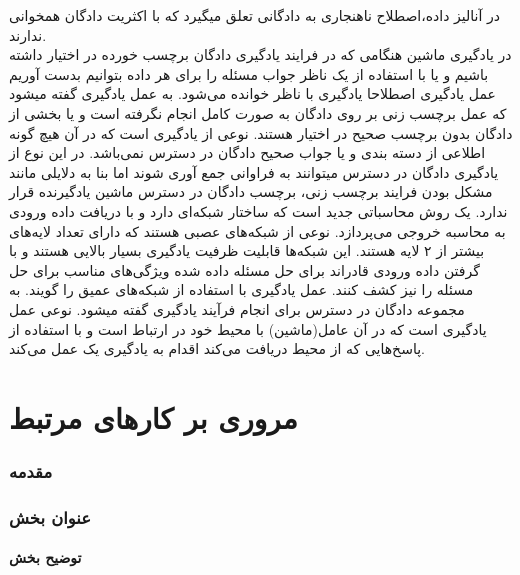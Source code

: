 \documentclass[12pt,a4paper]{report}
\theoremstyle{definition}
\theoremstyle{theorem}
\theoremstyle{definition}
\begin{document}
در آنالیز داده،‌اصطلاح ناهنجاری به دادگانی تعلق میگیرد که با اکثریت دادگان همخوانی ندارند.\\

در یادگیری ماشین هنگامی که در فرایند یادگیری دادگان برچسب خورده در اختیار داشته باشیم و یا با استفاده از یک ناظر جواب مسئله را برای هر داده بتوانیم بدست آوریم عمل یادگیری اصطلاحا یادگیری با ناظر خوانده می‌شود.
به عمل یادگیری گفته میشود که عمل برچسب زنی بر روی دادگان به صورت کامل انجام نگرفته است و یا بخشی از دادگان بدون برچسب صحیح در اختیار هستند.
نوعی از یادگیری است که در آن هیچ گونه اطلاعی از دسته بندی و یا جواب صحیح دادگان در دسترس نمی‌باشد. در این نوع از یادگیری دادگان در دسترس میتوانند به فراوانی جمع آوری شوند اما بنا به دلایلی مانند مشکل بودن فرایند برچسب زنی، برچسب دادگان در دسترس ماشین یادگیرنده قرار ندارد.
یک روش محاسباتی جدید است که ساختار شبکه‌ای دارد و با دریافت داده ورودی به محاسبه خروجی می‌پردازد.
نوعی از شبکه‌های عصبی هستند که دارای تعداد لایه‌های بیشتر از ۲ لایه هستند. این شبکه‌ها قابلیت ظرفیت یادگیری بسیار بالایی هستند و با گرفتن داده ورودی قادراند برای حل مسئله داده شده ویژگی‌های مناسب برای حل مسئله را نیز کشف کنند.
عمل یادگیری با استفاده از شبکه‌های عمیق را گویند.
به مجموعه دادگان در دسترس برای انجام فرآیند یادگیری گفته میشود.
نوعی عمل یادگیری است که در آن عامل(ماشین) با محیط خود در ارتباط است و با استفاده از پاسخ‌هایی که از محیط دریافت می‌کند اقدام به یادگیری یک عمل می‌کند.
	\chapter{مروری بر کار‌های مرتبط}
	\subsection{مقدمه}
	\subsection{عنوان بخش}
	\subsubsection{توضیح بخش}
\end{document}
